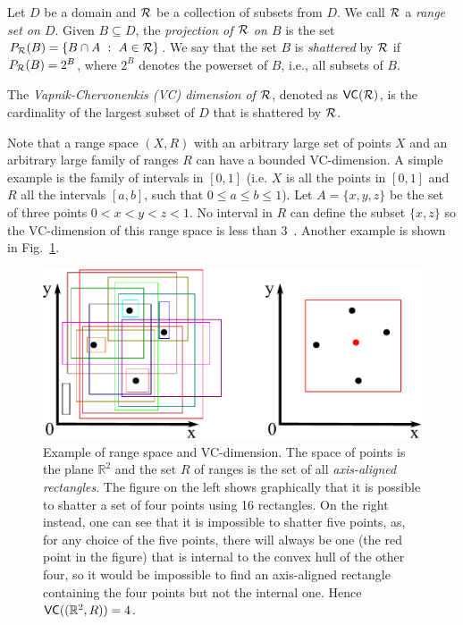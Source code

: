 Let $D$ be a domain and $\mathcal{R}$ be a collection of subsets from $D$. We call
$\mathcal{R}$ a \emph{range set on $D$}.
Given $B\subseteq D$, the \emph{projection of $\mathcal{R}$ on $B$} is the set 
$P_{\mathcal{R}}(B)=\{ B\cap A ~:~ A\in\mathcal{R}\}$. We say that the set $B$ is
\emph{shattered} by $\mathcal{R}$ if $P_{\mathcal{R}}(B)=2^B$, where $2^B$ denotes the
powerset of $B$, i.e., all subsets of $B$.

\begin{definition}\label{def:vcdim}
  The \emph{Vapnik-Chervonenkis (VC) dimension of $\mathcal{R}$}, denoted as
  $\mathsf{VC}(\mathcal{R})$, is the cardinality of the largest subset of $D$ that is
  shattered by $\mathcal{R}$.
\end{definition}

\ifproof
Note that a range space $(X,R)$ with an arbitrary large set of points $X$ and
an arbitrary large family of ranges $R$ can have a bounded VC-dimension. A simple
example is the family of intervals in $[0,1]$ (i.e. $X$ is all the points in
$[0,1]$ and $R$ all the intervals $[a,b]$, such that $0\leq a\leq b\leq 1$). Let
$A=\{x,y,z\}$ be the set of three points $0<x<y<z<1$. No interval in $R$ can
define the subset $\{x,z\}$ so the VC-dimension of this range space is less than
3~\citep[Lemma 10.3.1]{Matousek02}. Another example is shown in
Fig.~\ref{fig:rectangles}.
\begin{figure}[ht]
  \centering
  \includegraphics[width=.7\textwidth,keepaspectratio]{figures_dmkd/eps/rectangles}
  \caption{Example of range space and VC-dimension. The space of points is the
  plane $\mathbb{R}^2$ and the set $R$ of ranges is the set of all
  \emph{axis-aligned rectangles}. The figure on the left shows graphically that
  it is possible to shatter a set of four points using 16 rectangles. On the
  right instead, one can see that it is impossible to shatter five points, as,
  for any choice of the five points, there will always be one (the red point in
  the figure) that is internal to the convex hull of the other four, so it would
  be impossible to find an axis-aligned rectangle containing the four points
  but not the internal one. Hence $\mathsf{VC}((\mathbb{R}^2,R))=4$.}
  \label{fig:rectangles}
\end{figure}
\fi

